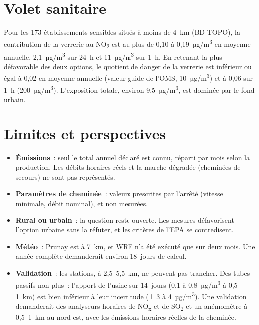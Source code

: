 \documentclass[11pt,a4paper]{article}
\newcommand{\NOx}{NO\textsubscript{x}}
\newcommand{\NOd}{NO\textsubscript{2}}
\newcommand{\SOd}{SO\textsubscript{2}}
\newcommand{\ugm}{µg/m\textsuperscript{3}}
\begin{document}
\section{Volet sanitaire}
Pour les 173 établissements sensibles situés à moins de 4~km (BD TOPO), la contribution de la verrerie au \NOd{} est
au plus de 0,10 à 0,19~\ugm{} en moyenne annuelle, 2,1~\ugm{} sur 24~h et 11~\ugm{} sur 1~h. En retenant la plus
défavorable des deux options, le quotient de danger de la verrerie est inférieur ou égal à 0,02 en moyenne annuelle
(valeur guide de l'OMS, 10~\ugm) et à 0,06 sur 1~h (200~\ugm). L'exposition totale, environ 9,5~\ugm, est dominée
par le fond urbain.

\section{Limites et perspectives}
\begin{itemize}
\item \textbf{Émissions}~: seul le total annuel déclaré est connu, réparti par mois selon la production. Les débits
horaires réels et la marche dégradée (cheminées de secours) ne sont pas représentés.
\item \textbf{Paramètres de cheminée}~: valeurs prescrites par l'arrêté (vitesse minimale, débit nominal), et non
mesurées.
\item \textbf{Rural ou urbain}~: la question reste ouverte. Les mesures défavorisent l'option urbaine sans la
réfuter, et les critères de l'EPA se contredisent.
\item \textbf{Météo}~: Prunay est à 7~km, et WRF n'a été exécuté que sur deux mois. Une année complète demanderait
environ 18~jours de calcul.
\item \textbf{Validation}~: les stations, à 2,5–5,5~km, ne peuvent pas trancher. Des tubes passifs non plus~:
l'apport de l'usine sur 14~jours (0,1 à 0,8~\ugm{} à 0,5–1~km) est bien inférieur à leur incertitude (± 3 à
4~\ugm). Une validation demanderait des analyseurs horaires de \NOx{} et de \SOd{} et un anémomètre à 0,5–1~km au
nord-est, avec les émissions horaires réelles de la cheminée.
\end{itemize}
\end{document}

